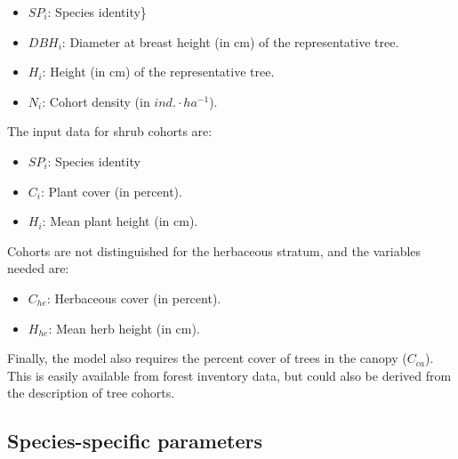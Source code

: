 \documentclass[]{book}
\providecommand{\tightlist}{%
  \setlength{\itemsep}{0pt}\setlength{\parskip}{0pt}}
\begin{document}
\begin{itemize}
\tightlist
\item
  \(SP_i\): Species identity\}
\item
  \(DBH_i\): Diameter at breast height (in cm) of the representative tree.
\item
  \(H_i\): Height (in cm) of the representative tree.
\item
  \(N_i\): Cohort density (in \(ind.\cdot ha^{-1}\)).
\end{itemize}

The input data for shrub cohorts are:

\begin{itemize}
\tightlist
\item
  \(SP_i\): Species identity
\item
  \(C_i\): Plant cover (in percent).
\item
  \(H_i\): Mean plant height (in cm).
\end{itemize}

Cohorts are not distinguished for the herbaceous stratum, and the variables needed are:

\begin{itemize}
\tightlist
\item
  \(C_{he}\): Herbaceous cover (in percent).
\item
  \(H_{he}\): Mean herb height (in cm).
\end{itemize}

Finally, the model also requires the percent cover of trees in the canopy (\(C_{ca}\)). This is easily available from forest inventory data, but could also be derived from the description of tree cohorts.

\hypertarget{species-specific-parameters}{%
\subsection{Species-specific parameters}\label{species-specific-parameters}}
\end{document}
